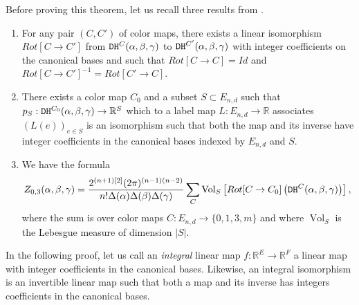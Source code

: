 \documentclass[11pt,a4paper]{amsart}
\providecommand{\R}{\mathbb R}
\providecommand{\Vol}{\operatorname{Vol}}
\providecommand{\dualhive}{\texttt{\textsc{DH}}}
\numberwithin{equation}{section}
\theoremstyle{definition}
\begin{document}
\noindent
Before proving this theorem, let us recall three results 
from \autocite{françois2024positiveformulaproductconjugacy}. 
\begin{enumerate}
\item For any pair $(C,C')$ of color maps, there exists a linear 
isomorphism $Rot[C\rightarrow C']$ 
from $\dualhive^C(\alpha,\beta,\gamma)$ to 
$\dualhive^{C'}(\alpha,\beta,\gamma)$ with integer coefficients 
on the canonical bases and such that 
$Rot[C\rightarrow C]=Id$ and $Rot[C\rightarrow C']^{-1}=Rot[C'\rightarrow C]$.
\item There exists a color map $C_0$ and a subset $S\subset E_{n,d}$ 
such that $p_S: \dualhive^{C_0}(\alpha,\beta,\gamma) \to \R^S$ which to a label map 
$L: E_{n, d} \to \R$ associates $(L(e))_{e \in S}$ is an isomorphism such that both the map and its inverse have integer coefficients in the canonical bases indexed by $E_{n,d}$ and $S$. 
\item We have the formula 
$$Z_{0, 3}(\alpha,\beta,\gamma) = 
    \frac{2^{(n+1) [2]}(2\pi)^{(n-1)(n-2)}} 
    {n! \Delta(\alpha) \Delta(\beta) \Delta(\gamma)} 
    \sum_{C} 
    \Vol_S\left[Rot[C\rightarrow C_0] \left(\dualhive^C(\alpha,\beta,\gamma)\right) \right],$$
    where the sum is over color maps $C: E_{n, d} \to \{0, 1, 3, m\}$ 
    and where $\Vol_S$ is the Lebesgue measure of dimension $|S|$.
\end{enumerate}
In the following proof, let us call an {\it integral} linear map $f:\mathbb{R}^E\rightarrow \mathbb{R}^F$ a linear map with integer coefficients in the canonical bases. Likewise, an integral isomorphism is an invertible linear map such that both a map and its inverse has integers coefficients in the canonical bases.
\end{document}
